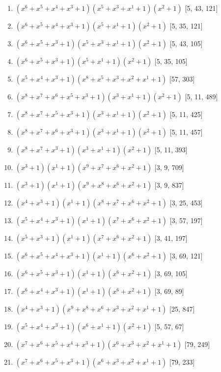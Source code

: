 \documentclass[10pt,twocolumn]{article}
\begin{document}
\begin{enumerate}
\item $(x^{6} + x^{5} + x^{4} + x^{3} + 1)(x^{5} + x^{3} + x^{1} + 1)(x^{2} + 1)$  [5, 43, 121]
\item $(x^{6} + x^{5} + x^{4} + x^{3} + 1)(x^{5} + x^{1} + 1)(x^{2} + 1)$  [5, 35, 121]
\item $(x^{6} + x^{5} + x^{3} + 1)(x^{5} + x^{3} + x^{1} + 1)(x^{2} + 1)$  [5, 43, 105]
\item $(x^{6} + x^{5} + x^{3} + 1)(x^{5} + x^{1} + 1)(x^{2} + 1)$  [5, 35, 105]
\item $(x^{5} + x^{4} + x^{3} + 1)(x^{8} + x^{5} + x^{3} + x^{2} + x^{1} + 1)$  [57, 303]
\item $(x^{8} + x^{7} + x^{6} + x^{5} + x^{3} + 1)(x^{3} + x^{1} + 1)(x^{2} + 1)$  [5, 11, 489]
\item $(x^{8} + x^{7} + x^{5} + x^{3} + 1)(x^{3} + x^{1} + 1)(x^{2} + 1)$  [5, 11, 425]
\item $(x^{8} + x^{7} + x^{6} + x^{3} + 1)(x^{3} + x^{1} + 1)(x^{2} + 1)$  [5, 11, 457]
\item $(x^{8} + x^{7} + x^{3} + 1)(x^{3} + x^{1} + 1)(x^{2} + 1)$  [5, 11, 393]
\item $(x^{3} + 1)(x^{1} + 1)(x^{9} + x^{7} + x^{6} + x^{2} + 1)$  [3, 9, 709]
\item $(x^{3} + 1)(x^{1} + 1)(x^{9} + x^{8} + x^{6} + x^{2} + 1)$  [3, 9, 837]
\item $(x^{4} + x^{3} + 1)(x^{1} + 1)(x^{8} + x^{7} + x^{6} + x^{2} + 1)$  [3, 25, 453]
\item $(x^{5} + x^{4} + x^{3} + 1)(x^{1} + 1)(x^{7} + x^{6} + x^{2} + 1)$  [3, 57, 197]
\item $(x^{5} + x^{3} + 1)(x^{1} + 1)(x^{7} + x^{6} + x^{2} + 1)$  [3, 41, 197]
\item $(x^{6} + x^{5} + x^{4} + x^{3} + 1)(x^{1} + 1)(x^{6} + x^{2} + 1)$  [3, 69, 121]
\item $(x^{6} + x^{5} + x^{3} + 1)(x^{1} + 1)(x^{6} + x^{2} + 1)$  [3, 69, 105]
\item $(x^{6} + x^{4} + x^{3} + 1)(x^{1} + 1)(x^{6} + x^{2} + 1)$  [3, 69, 89]
\item $(x^{4} + x^{3} + 1)(x^{9} + x^{8} + x^{6} + x^{3} + x^{2} + x^{1} + 1)$  [25, 847]
\item $(x^{5} + x^{4} + x^{3} + 1)(x^{6} + x^{1} + 1)(x^{2} + 1)$  [5, 57, 67]
\item $(x^{7} + x^{6} + x^{5} + x^{4} + x^{3} + 1)(x^{6} + x^{3} + x^{2} + x^{1} + 1)$  [79, 249]
\item $(x^{7} + x^{6} + x^{5} + x^{3} + 1)(x^{6} + x^{3} + x^{2} + x^{1} + 1)$  [79, 233]

\end{enumerate}
\end{document}

